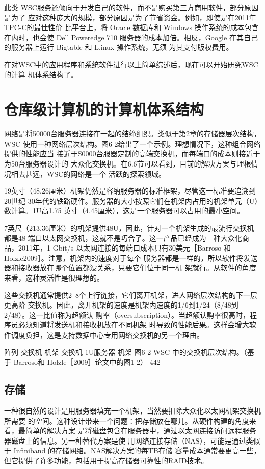 此类 WSC服务还倾向于开发自己的软件，而不是购买第三方商用软件，部分原因是为了
应对这种庞大的规模，部分原因是为了节省资金。例如，即使是在2011年TPC-C的最佳性价
比平台上，将 Oracle 数据库和 Windows 操作系统的成本包含在内时，也会使 Dell Poweredge 710
服务器的成本加倍。相反，Google 在其自己的服务器上运行 Bigtable 和 L.inux 操作系统，无须
为其支付版权费用。

在对WSC中的应用程序和系统软件进行以上简单综述后，现在可以开始研究WSC的计算
机体系结构了。

\section{仓库级计算机的计算机体系结构}
网络是将50000台服务器连接在一起的结缔组织。类似于第2章的存储器层次结构，WSC
使用一种网络层次结构。图6-2给出了一个示例。理想情况下，这种组合网络提供的性能应当
接近于S0000台服器定制的高端交换机，而每端口的成本则接近于为50台服务器设计的
大众化交换机。在6.6节可以看到，目前的解决方案与理根情况相去甚远，WSC的网络是一个
活跃的探索领域。

19英寸（48.26厘米）机架仍然是容纳服务器的标准框架，尽管这一标准要追溯到20世纪
30年代的铁路硬件。服务器的大小按照它们在机架内占用的机架单元（U）数计算。1U高1.75
英寸（4.45厘米），这是一个服务器可以占用的最小空间。

7英尺（213.36厘米）的机架提供48U，因此，针对一个机架生成的最流行交换机都是48
端口以太网交换机，这就不是巧合了。这一产品已经成为—种大众化商品，2011年，1 Gbit/s
以太网连接的每端口成本只有30美元［Barroso 和 Holzle2009］。注意，机架内的速度对于每个
服务器都是一样的，所以软件将发送器和接收器放在哪个位置都没关系，只要它们位于同一机
架就行。从软件的角度来看，这种灵活性是很理想的。

这些交换机通常提供2~8个上行链接，它们离开机架，进人网络层次结构的下一层更高阶
交换机。因此，离开机架的速度是机架内速度的1/6到1/24（8/48到2/48）。这一比值称为超额认
购率（oversubscription）。当超额认购率很高时，程序员必须知道将发送机和接收机放在不同机架
时导致的性能后果。这样会增大软件调度负担，这是支持数据中心专用网络交换机的另一个理由。

阵列
交换机
机架
交换机
1U服务器
机架
图6-2 WSC 中的交换机层次结构。（基于 Barroso和 Holzle［2009］论文中的图1-2）
442

\subsection{存储}
一种很自然的设计是用服务器填充一个机架，当然要扣除大众化以太网机架交换机所需要
的空间。这种设计带来一个问题：把存储放在哪儿。从硬件构建的角度来看，最简单的解决方案
是将磁盘包含在服务器中，通过以太网连接访问远程服务器磁盘上的信息。另一种替代方案是使
用网络连接存储（NAS），可能是通过类似于 Infiniband 的存储网络。NAS解决方案的每TB存储
容量成本通常要更高一些，但它提供了许多功能，包括用于提高存储器可靠性的RAID技术。

